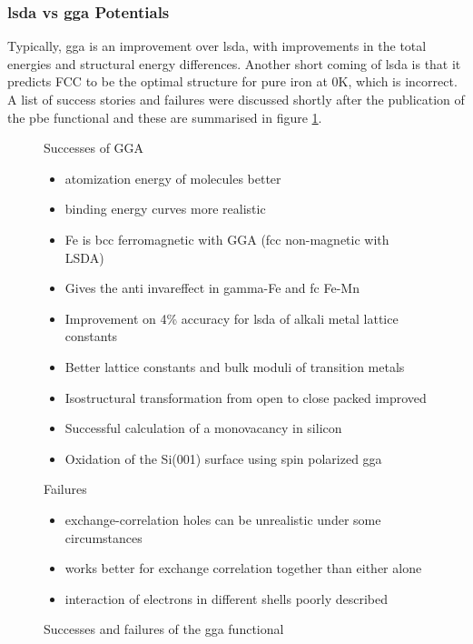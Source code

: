 \subsubsection{\acrshort{lsda} vs \acrshort{gga} Potentials}
\label{section:ggavslsda}

Typically, \acrshort{gga} is an improvement over \acrshort{lsda}, with improvements in the total energies and structural energy differences\cite{perdewggamadesimple}.  Another short coming of \acrshort{lsda} is that it predicts FCC to be the optimal structure for pure iron at 0K, which is incorrect\cite{perdewggabackwardforward}.  A list of success stories and failures were discussed shortly after the publication of the \acrshort{pbe} functional and these are summarised in figure \ref{fig:pbesuccessfailure}\cite{ldaggaperdew}.

\begin{figure}
\begin{minipage}[t]{.42\textwidth}
Successes of GGA
\begin{itemize}
\item atomization energy of molecules better
\item binding energy curves more realistic
\item Fe is bcc ferromagnetic with GGA (fcc non-magnetic with LSDA)
\item Gives the anti \gls{invareffect} in gamma-Fe and fc Fe-Mn 
\item Improvement on 4\% accuracy for \acrshort{lsda} of alkali metal lattice constants
\item Better lattice constants and bulk moduli of transition metals
\item Isostructural transformation from open to close packed improved
\item Successful calculation of a monovacancy in silicon
\item Oxidation of the Si(001) surface using spin polarized \acrshort{gga}
\end{itemize}
\end{minipage}
\begin{minipage}{.15\textwidth}
\end{minipage}
\begin{minipage}[t]{.42\textwidth}
Failures
\begin{itemize}
\item exchange-correlation holes can be unrealistic under some circumstances
\item works better for exchange correlation together than either alone
\item interaction of electrons in different shells poorly described
\end{itemize}
\end{minipage}
\caption{Successes and failures of the \acrshort{gga} functional\cite{ldaggaperdew}}
\label{fig:pbesuccessfailure}
\end{figure}

